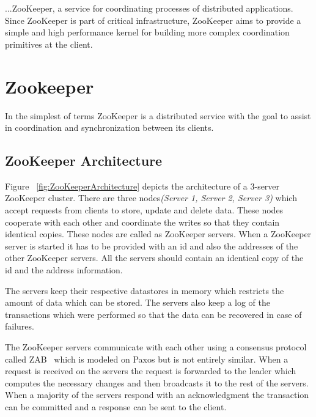 \begin{savequote}[100mm]
...ZooKeeper, a service for coordinating processes of distributed applications. Since ZooKeeper is part of critical infrastructure, ZooKeeper aims to provide a simple and high performance kernel for building more complex coordination primitives at the client.
\end{savequote}

\chapter{Zookeeper}
In the simplest of terms ZooKeeper is a distributed service with the goal to assist in coordination and synchronization between its clients.

\section{ZooKeeper Architecture}

Figure ~\ref{fig:ZooKeeperArchitecture} depicts the architecture of a 3-server ZooKeeper cluster. There are three nodes\textit{(Server 1, Server 2, Server 3)} which accept requests from clients to store, update and delete data. These nodes cooperate with each other and coordinate the writes so that they contain identical copies. These nodes are called as ZooKeeper servers. When a ZooKeeper server is started it has to be provided with an id and also the addresses of the other ZooKeeper servers. All the servers should contain an identical copy of the id and the address information.

The servers keep their respective datastores in memory which restricts the amount of data which can be stored. The servers also keep a log of the transactions which were performed so that the data can be recovered in case of failures.

\addvspace{2.5em}

\addvspace{1.0em}

The ZooKeeper servers communicate with each other using a consensus protocol called ZAB~\cite{junqueira2011zab} which is modeled on Paxos but is not entirely similar. When a request is received on the servers the request is forwarded to the leader which computes the necessary changes and then broadcasts it to the rest of the servers. When a majority of the servers respond with an acknowledgment the transaction can be committed and a response can be sent to the client. 

